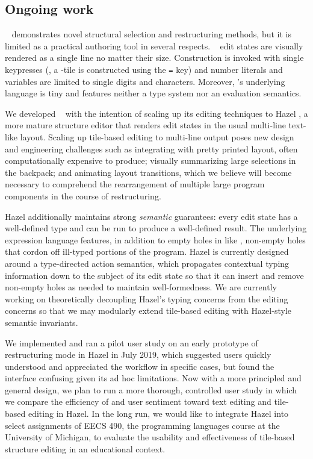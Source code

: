 \subsection{Ongoing work}

\tylr~ demonstrates novel structural selection and restructuring
methods, but it is limited
as a practical authoring tool in several respects.
\tylr~ edit states are visually rendered as a single line
no matter their size.
Construction is invoked with single keypresses (\eg,
a -tile is constructed using the \texttt{=} key)
and number literals and variables are limited to
single digits and characters.
Moreover, \tylr's underlying language is tiny and
features neither a type system nor an evaluation semantics.

We developed \tylr~ with the intention of scaling up
its editing techniques to Hazel ,
a more mature structure editor that renders
edit states in the usual multi-line text-like layout.
Scaling up tile-based editing to multi-line output
poses new design and engineering challenges
such as integrating with pretty printed layout,
often computationally expensive to produce;
visually summarizing large selections in the backpack;
and animating layout transitions, which
we believe will become necessary to
comprehend the rearrangement of multiple large program
components in the course of restructuring.

Hazel additionally maintains strong
\emph{semantic} guarantees: every edit state
has a well-defined type and can be run to
produce a well-defined result.
The underlying expression language features, in
addition to empty holes in like \tylr, non-empty
holes that cordon off ill-typed portions
of the program.
Hazel is currently designed around
a type-directed action semantics, which
propagates contextual typing information
down to the subject of its edit state
so that it can insert and remove non-empty holes
as needed to maintain well-formedness.
We are currently working on theoretically decoupling
Hazel's typing concerns from the editing concerns
so that we may modularly extend tile-based editing
with Hazel-style semantic invariants.

We implemented and ran a pilot user study on an early
prototype of restructuring mode in Hazel in July 2019, which suggested
users quickly understood and appreciated the workflow in specific
cases, but found the interface confusing given its ad hoc limitations.
Now with a more principled and general design,
we plan to run a more thorough, controlled user study in which
we compare the efficiency of and user sentiment
toward text editing and tile-based editing in Hazel.
In the long run, we would like to integrate Hazel into
select assignments of EECS 490, the programming languages
course at the University of Michigan, to evaluate the
usability and effectiveness of tile-based structure editing
in an educational context.
